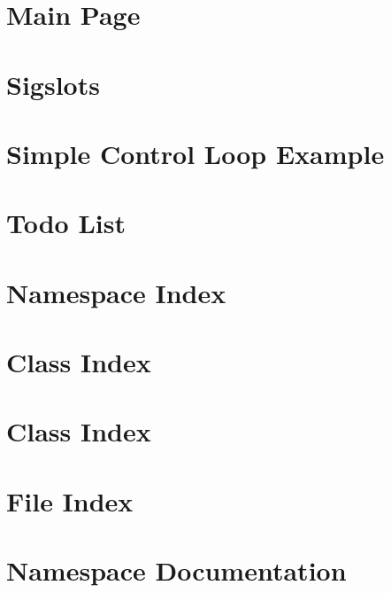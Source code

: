\documentclass[a4paper]{book}
\begin{document}
\chapter{\-Main \-Page}
\label{koMainPage}

\chapter{\-Sigslots}
\label{koSigslotsGuide}

\chapter{\-Simple \-Control \-Loop \-Example}
\label{koSimpleExample}

\chapter{\-Todo \-List}
\label{todo}

\chapter{\-Namespace \-Index}

\chapter{\-Class \-Index}

\chapter{\-Class \-Index}

\chapter{\-File \-Index}

\chapter{\-Namespace \-Documentation}


\end{document}
